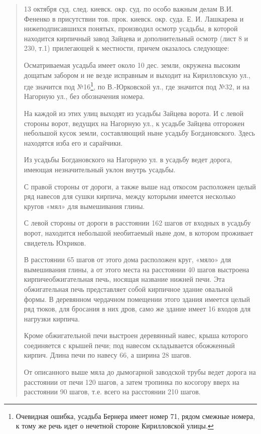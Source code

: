 \begin{quotation} 
13 октября суд. след. киевск. окр. суд. по особо важным делам В.И. Фененко в присутствии тов. прок. киевск. окр. суда. Е. И. Лашкарева и нижеподписавшихся понятых, производил осмотр усадьбы, в которой находится кирпичный завод Зайцева и дополнительный осмотр (лист 8 и 230, т.1) прилегающей к местности, причем оказалось следующее:

Осматриваемая усадьба имеет около 10 дес. земли, окружена высоким дощатым забором и не везде исправным и выходит на Кирилловскую ул., где значится под №16\footnote{Очевидная ошибка, усадьба Бернера имеет номер 71, рядом смежные номера, к тому же речь идет о нечетной стороне Кирилловской улицы.}, по В.-Юрков\-ской ул., где значится под №32, и на Нагорную ул., без обозначения номера.

На каждой из этих улиц выходят из усадьбы Зайцева ворота. И с левой стороны ворот, ведущих на Нагорную ул., к усадьбе Зайцева отгорожен небольшой кусок земли, составляющий ныне усадьбу Богдановского. Здесь находятся изба его и сарайчики. 

Из усадьбы Богдановского на Нагорную ул. в усадьбу ведет дорога, имеющая незначительный уклон внутрь усадьбы. 

С правой стороны от дороги, а также выше над откосом расположен целый ряд навесов для сушки кирпича, между которыми имеется несколько кругов «мял» для вымешивания глины.

С левой стороны от дороги в расстоянии 162 шагов от входных в усадьбу ворот, находится небольшой необитаемый ныне дом, в котором проживает свидетель Юхриков.

В расстоянии 65 шагов от этого дома расположен круг, «мяло» для вымешивания глины, а от этого места на расстоянии 40 шагов выстроена кирпичеобжигательная печь, носящая название нижней печи. Эта обжигательная печь представляет собой кирпичное здание овальной формы. В деревянном чердачном помещении этого здания имеется целый ряд тюков, для бросания в них дров, само же здание имеет 16 входов для нагрузки кирпича.

Кроме обжигательной печи выстроен деревянный навес, крыша которого соединяется с крышей печи; под навесом складывается обожженный кирпич. Длина печи по навесу 66, а ширина 28 шагов.

От описанного выше мяла до дымогарной заводской трубы ведет дорога на расстоянии от печи 120 шагов, а затем тропинка по косогору вверх на расстоянии 90 шагов, т.е. всего на расстоянии 210 шагов.


\end{quotation}
